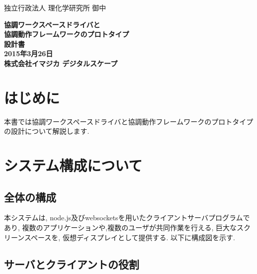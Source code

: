 \documentclass[a4paper,10pt,oneside]{jsbook}
\begin{document}
\begin{titlepage}
\noindent
独立行政法人 理化学研究所 御中
\begin{center}
	\vspace{8cm}
	{\Huge \textbf{協調ワークスペースドライバと}} \\
	\vspace{1cm}
	{\Huge \textbf{協調動作フレームワークのプロトタイプ}} \\
	\vspace{1cm}
	{\Huge \textbf{設計書}} \\
	\vspace{10cm}
	{\Large \textbf{2015年3月26日}} \\
	\vspace{0.5cm}
	{\Large \textbf{株式会社イマジカ デジタルスケープ}}
\end{center}
\end{titlepage}

\tableofcontents

\chapter{はじめに}
本書では協調ワークスペースドライバと協調動作フレームワークのプロトタイプの設計について解説します.

\chapter{システム構成について}
\section{全体の構成}
本システムは, node.js及びwebsocketsを用いたクライアントサーバプログラムであり, 複数のアプリケーションや,複数のユーザが共同作業を行える, 巨大なスクリーンスペースを, 仮想ディスプレイとして提供する. 以下に構成図を示す.


\section{サーバとクライアントの役割}
\end{document}
